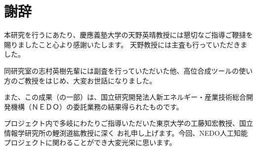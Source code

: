 \chapter*{謝辞}
本研究を行うにあたり、慶應義塾大学の天野英晴教授には懇切なご指導ご鞭撻を賜りましたこと心より感謝いたします。
天野教授には主査も行っていただきました。

同研究室の志村英樹先輩には副査を行っていただいた他、高位合成ツールの使い方のご教授をはじめ、大変お世話になりました。

また、この成果（の一部）は、国立研究開発法人新エネルギー・産業技術総合開発機構（ＮＥＤＯ）の委託業務の結果得られたものです。

プロジェクト内で多岐にわたりご指導いただいた東京大学の工藤知宏教授、国立情報学研究所の鯉渕道紘教授に深く
お礼申し上げます。今回、NEDO人工知能プロジェクトに関わることができ大変光栄に思います。
